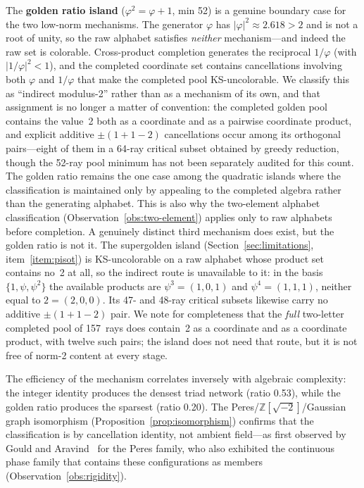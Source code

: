 \documentclass[12pt,a4paper]{article}
\newcommand{\Z}{\mathbb{Z}}
\begin{document}
The \textbf{golden ratio island} ($\varphi^2 = \varphi + 1$, min 52) is a genuine boundary case for the two low-norm mechanisms. The generator $\varphi$ has $|\varphi|^2 \approx 2.618 > 2$ and is not a root of unity, so the raw alphabet satisfies \emph{neither} mechanism---and indeed the raw set is colorable.  Cross-product completion generates the reciprocal $1/\varphi$ (with $|1/\varphi|^2 < 1$), and the completed coordinate set contains cancellations involving both $\varphi$ and $1/\varphi$ that make the completed pool KS-uncolorable.  We classify this as ``indirect modulus-2'' rather than as a mechanism of its own, and that assignment is no longer a matter of convention: the completed golden pool contains the value~2 both as a coordinate and as a pairwise coordinate product, and explicit additive $\pm(1 + 1 - 2)$ cancellations occur among its orthogonal pairs---eight of them in a 64-ray critical subset obtained by greedy reduction, though the 52-ray pool minimum has not been separately audited for this count.  The golden ratio remains the one case among the quadratic islands where the classification is maintained only by appealing to the completed algebra rather than the generating alphabet.  This is also why the two-element alphabet classification (Observation~\ref{obs:two-element}) applies only to raw alphabets before completion.  A genuinely distinct third mechanism does exist, but the golden ratio is not it.  The supergolden island (Section~\ref{sec:limitations}, item~\ref{item:pisot}) is KS-uncolorable on a raw alphabet whose product set contains no~2 at all, so the indirect route is unavailable to it: in the basis $\{1, \psi, \psi^2\}$ the available products are $\psi^3 = (1,0,1)$ and $\psi^4 = (1,1,1)$, neither equal to $2 = (2,0,0)$.  Its 47- and 48-ray critical subsets likewise carry no additive $\pm(1+1-2)$ pair.  We note for completeness that the \emph{full} two-letter completed pool of 157~rays does contain~2 as a coordinate and as a coordinate product, with twelve such pairs; the island does not need that route, but it is not free of norm-2 content at every stage.

The efficiency of the mechanism correlates inversely with algebraic complexity: the integer identity produces the densest triad network (ratio 0.53), while the golden ratio produces the sparsest (ratio 0.20).  The Peres/$\Z[\sqrt{-2}]$/Gaussian graph isomorphism (Proposition~\ref{prop:isomorphism}) confirms that the classification is by cancellation identity, not ambient field---as first observed by Gould and Aravind~\cite{GouldAravind2010} for the Peres family, who also exhibited the continuous phase family that contains these configurations as members (Observation~\ref{obs:rigidity}).
\end{document}
